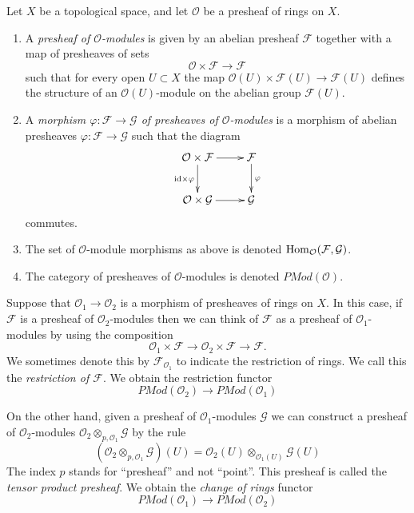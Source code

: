 \begin{definition}
\label{definition-presheaf-modules}
Let $X$ be a topological space, and let $\mathcal{O}$ be
a presheaf of rings on $X$.
\begin{enumerate}
\item A {\it presheaf of $\mathcal{O}$-modules}
is given by an abelian presheaf $\mathcal{F}$ together with a
map of presheaves of sets
$$
\mathcal{O} \times \mathcal{F} \longrightarrow \mathcal{F}
$$
such that for every open $U \subset X$ the map
$\mathcal{O}(U) \times \mathcal{F}(U) \to \mathcal{F}(U)$
defines the structure of an $\mathcal{O}(U)$-module
on the abelian group $\mathcal{F}(U)$.
\item A {\it morphism $\varphi : \mathcal{F} \to \mathcal{G}$
of presheaves of $\mathcal{O}$-modules} is a morphism of abelian presheaves
$\varphi : \mathcal{F} \to \mathcal{G}$ such that
the diagram
$$
\xymatrix{
\mathcal{O} \times \mathcal{F} \ar[r] \ar[d]_{\text{id} \times \varphi} &
\mathcal{F} \ar[d]^{\varphi} \\
\mathcal{O} \times \mathcal{G} \ar[r] &
\mathcal{G}
}
$$
commutes.
\item The set of $\mathcal{O}$-module morphisms as above is
denoted $\mathop{\mathrm{Hom}}\nolimits_\mathcal{O}(\mathcal{F}, \mathcal{G})$.
\item The category of presheaves of $\mathcal{O}$-modules
is denoted $\textit{PMod}(\mathcal{O})$.
\end{enumerate}
\end{definition}

\noindent
Suppose that $\mathcal{O}_1 \to \mathcal{O}_2$ is a
morphism of presheaves of rings on $X$. In this case,
if $\mathcal{F}$ is a presheaf of $\mathcal{O}_2$-modules
then we can think of $\mathcal{F}$ as a presheaf of
$\mathcal{O}_1$-modules by using the composition
$$
\mathcal{O}_1 \times \mathcal{F}
\to
\mathcal{O}_2 \times \mathcal{F}
\to
\mathcal{F}.
$$
We sometimes denote this by $\mathcal{F}_{\mathcal{O}_1}$
to indicate the restriction of rings. We call this
the {\it restriction of $\mathcal{F}$}. We obtain the
restriction functor
$$
\textit{PMod}(\mathcal{O}_2)
\longrightarrow
\textit{PMod}(\mathcal{O}_1)
$$

\medskip\noindent
On the other hand, given a presheaf of $\mathcal{O}_1$-modules
$\mathcal{G}$
we can construct a presheaf of $\mathcal{O}_2$-modules
$\mathcal{O}_2 \otimes_{p, \mathcal{O}_1} \mathcal{G}$
by the rule
$$
\left(\mathcal{O}_2 \otimes_{p, \mathcal{O}_1} \mathcal{G}\right)(U)
=
\mathcal{O}_2(U) \otimes_{\mathcal{O}_1(U)} \mathcal{G}(U)
$$
The index $p$ stands for ``presheaf'' and not ``point''.
This presheaf is called the {\it tensor product presheaf}. We obtain
the {\it change of rings} functor
$$
\textit{PMod}(\mathcal{O}_1)
\longrightarrow
\textit{PMod}(\mathcal{O}_2)
$$

